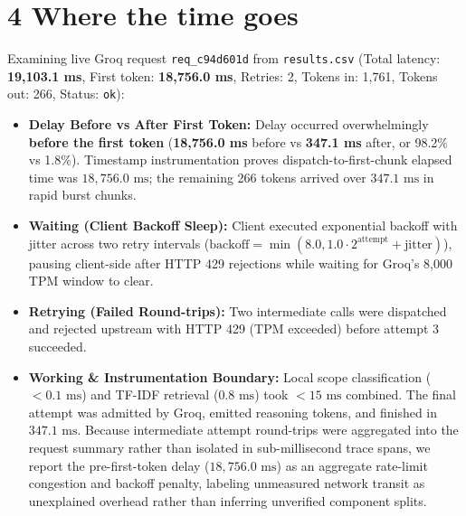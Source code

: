 \documentclass[8.5pt,a4paper]{article}
\begin{document}
\section*{4 Where the time goes}
Examining live Groq request \texttt{req\_c94d601d} from \texttt{results.csv} (Total latency: \textbf{19,103.1 ms}, First token: \textbf{18,756.0 ms}, Retries: 2, Tokens in: 1,761, Tokens out: 266, Status: \texttt{ok}):
\begin{itemize}
    \item \textbf{Delay Before vs After First Token:} Delay occurred overwhelmingly \textbf{before the first token} (\textbf{18,756.0 ms} before vs \textbf{347.1 ms} after, or 98.2\% vs 1.8\%). Timestamp instrumentation proves dispatch-to-first-chunk elapsed time was $18,756.0\text{ ms}$; the remaining 266 tokens arrived over $347.1\text{ ms}$ in rapid burst chunks.
    \item \textbf{Waiting (Client Backoff Sleep):} Client executed exponential backoff with jitter across two retry intervals ($\text{backoff}=\min(8.0,1.0\cdot 2^{\text{attempt}}+\text{jitter})$), pausing client-side after HTTP 429 rejections while waiting for Groq's 8,000 TPM window to clear.
    \item \textbf{Retrying (Failed Round-trips):} Two intermediate calls were dispatched and rejected upstream with HTTP 429 (TPM exceeded) before attempt 3 succeeded.
    \item \textbf{Working \& Instrumentation Boundary:} Local scope classification ($<0.1\text{ ms}$) and TF-IDF retrieval ($0.8\text{ ms}$) took $<15\text{ ms}$ combined. The final attempt was admitted by Groq, emitted reasoning tokens, and finished in $347.1\text{ ms}$. Because intermediate attempt round-trips were aggregated into the request summary rather than isolated in sub-millisecond trace spans, we report the pre-first-token delay ($18,756.0\text{ ms}$) as an aggregate rate-limit congestion and backoff penalty, labeling unmeasured network transit as unexplained overhead rather than inferring unverified component splits.
\end{itemize}
\end{document}
